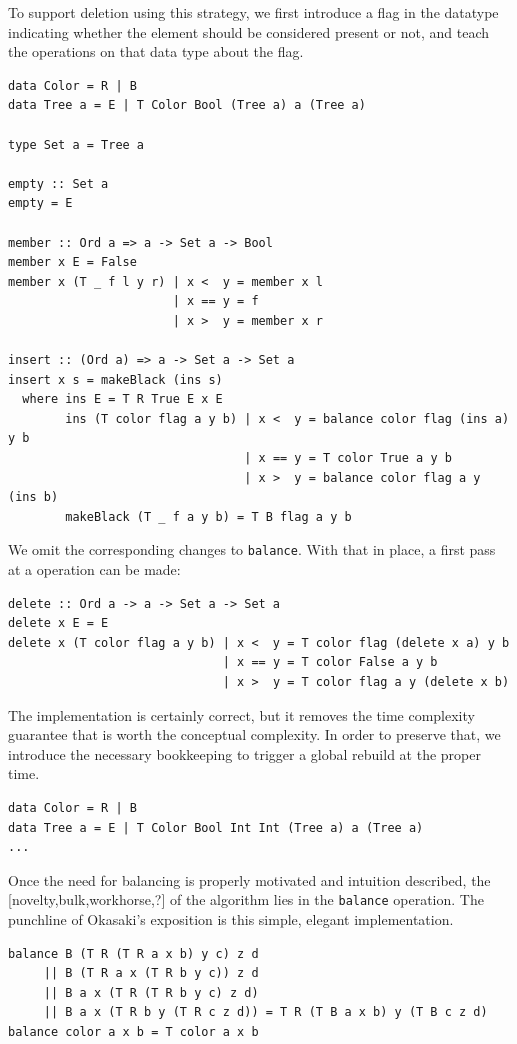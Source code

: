 \documentclass[preprint]{sigplanconf}
\begin{document}
To support deletion using this strategy, we first introduce a flag in the datatype indicating whether the element should be considered present or not, and teach the operations on that data type about the flag.
\begin{verbatim}
data Color = R | B
data Tree a = E | T Color Bool (Tree a) a (Tree a)

type Set a = Tree a

empty :: Set a
empty = E

member :: Ord a => a -> Set a -> Bool
member x E = False
member x (T _ f l y r) | x <  y = member x l
                       | x == y = f
                       | x >  y = member x r 

insert :: (Ord a) => a -> Set a -> Set a
insert x s = makeBlack (ins s)
  where ins E = T R True E x E
        ins (T color flag a y b) | x <  y = balance color flag (ins a) y b
                                 | x == y = T color True a y b
                                 | x >  y = balance color flag a y (ins b)
        makeBlack (T _ f a y b) = T B flag a y b
\end{verbatim}
We omit the corresponding changes to \texttt{balance}. With that in place, a first pass at a \cite{delete} operation can be made:
\begin{verbatim}
delete :: Ord a -> a -> Set a -> Set a
delete x E = E
delete x (T color flag a y b) | x <  y = T color flag (delete x a) y b
                              | x == y = T color False a y b
                              | x >  y = T color flag a y (delete x b)
\end{verbatim}
The implementation is certainly correct, but it removes the time complexity guarantee that is worth the conceptual complexity. In order to preserve that, we introduce the necessary bookkeeping to trigger a global rebuild at the proper time.
\begin{verbatim}
data Color = R | B
data Tree a = E | T Color Bool Int Int (Tree a) a (Tree a)
...
\end{verbatim}
Once the need for balancing is properly motivated and intuition described, the [novelty,bulk,workhorse,?] of the algorithm lies in the \texttt{balance} operation. The punchline of Okasaki's exposition is this simple, elegant implementation.
\begin{verbatim}
balance B (T R (T R a x b) y c) z d
     || B (T R a x (T R b y c)) z d
     || B a x (T R (T R b y c) z d)
     || B a x (T R b y (T R c z d)) = T R (T B a x b) y (T B c z d)
balance color a x b = T color a x b
\end{verbatim}
\end{document}

